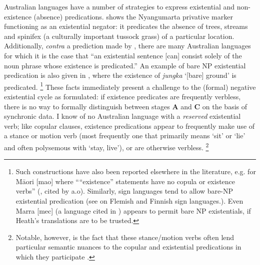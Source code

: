 \documentclass[output=paper]{langsci/langscibook}
\begin{document}
Australian languages have a number of strategies to express existential and
non-existence (absence) predications.
         shows the Nyangumarta
privative marker functioning as an existential negator: it
predicates the absence of trees, streams and spinifex (a culturally
important tussock grass) of a particular location. Additionally,
\textit{contra} a prediction made by \citet[19]{Croft1991}, there
are many Australian languages for which it is the case that ``an
existential sentence [can] consist solely of the noun phrase whose
existence is predicated.'' An example of bare NP existential
predication is also given in
, where the existence of
\textit{jungka} `[bare] ground' is predicated.%
%
\footnote{Such constructions have also been reported elsewhere in the
        literature, e.g. for Māori [mao] where ``{}``existence'' statements
        have no copula or existence verbs'' (\citealt[78]{Bauer1993}, cited
        by \citealp{ChungLadusaw2004} a.o). Similarly, sign languages tend
        to allow bare-NP existential predication (see
        \citealt[26ff]{deWeert2016} on Flemish and Finnish sign
        languages.). Even Marra [mec] (a language cited in \citealt[14]{Croft1991}) appears to permit bare NP existentials, if Heath's \citeyearpar[364]{Heath1981} translations are to be trusted.}
 These facts immediately present a challenge to the (formal) negative
        existential cycle as formulated: if existence predicates are
        frequently verbless, there is no way to formally distinguish
        between stages \textbf{A} and \textbf{C} on the basis of synchronic
        data. I know of no Australian language with a \textit{reserved}
        existential verb; like copular clauses, existence predications
        appear to frequently make use of a stance or motion verb (most
        frequently one that primarily means `sit' or `lie' and often
        polysemous with `stay, live'), or are otherwise verbless.%
\footnote{Notable, however, is the fact that these stance\slash motion verbs
often lend particular semantic nuances to the copular and existential
predications in which they participate \citep[see e.g.][610--611]{Wilkinson1991}.}
\end{document}
